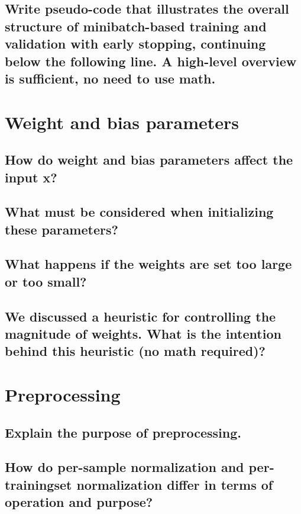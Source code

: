 \subsection{Write pseudo-code that illustrates the overall structure of minibatch-based training and validation with early stopping, continuing below the following line. A high-level overview is sufficient, no need to use math.}

\section{Weight and bias parameters}

\subsection{How do weight and bias parameters affect the input x?}

\subsection{What must be considered when initializing these parameters?}

\subsection{What happens if the weights are set too large or too small?}

\subsection{We discussed a heuristic for controlling the magnitude of weights. What is the intention behind this heuristic (no math required)?}

\section{Preprocessing}

\subsection{Explain the purpose of preprocessing.}

\subsection{How do per-sample normalization and per-trainingset normalization differ in terms of operation and purpose?}

